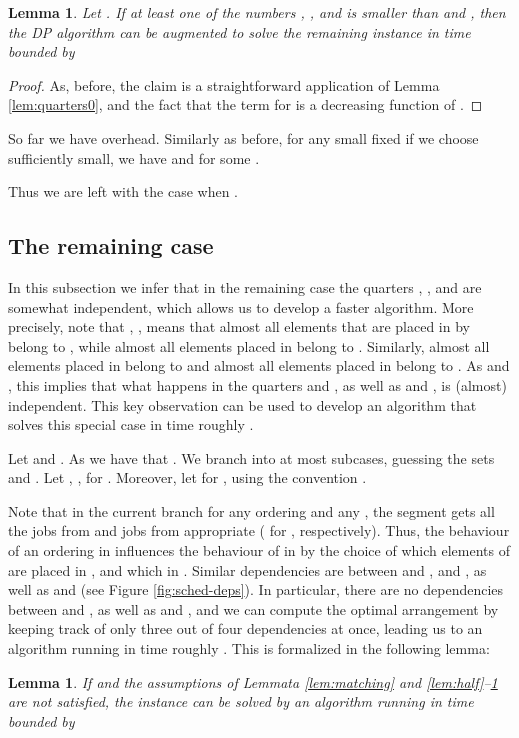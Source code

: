 \documentclass{article}
\newtheorem{lemma}[theorem]{Lemma}
\theoremstyle{definition}
\begin{document}
\begin{lemma}\label{lem:quarters2}
Let .
If at least one of the numbers , ,  and  is smaller than  and ,
then the DP algorithm can be augmented to solve the remaining instance in time bounded by

\end{lemma}
\begin{proof}
As, before, the claim is a straightforward application of Lemma \ref{lem:quarters0}, and the fact that the term  for  is a decreasing function of .
\end{proof}

So far we have  overhead. Similarly as before, for any small fixed  if we choose  sufficiently small, we have 
and  for some . 

Thus we are left with the case when .

\subsection{The remaining case}\label{sec:finish}

In this subsection we infer that in the remaining case the quarters , ,  and  are somewhat independent, which allows us to develop a faster algorithm. More precisely, note that , , means that
almost all elements that are placed in  by  belong to , while almost all elements placed in  belong to . Similarly, almost all elements placed in  belong to  and almost all elements placed in  belong to .
As  and , this implies that what happens in the quarters  and , as well as  and , is (almost) independent. This key observation can be used to develop an algorithm that solves this special case in time roughly .

Let  and .
As  we have that .
We branch into at most  subcases, guessing the sets  and .
Let , ,  for .
Moreover, let  for , using the convention .

Note that in the current branch for any ordering and any , the segment  gets all the jobs from  and 
jobs from appropriate 
( for , respectively).
Thus, the behaviour of an ordering  in  influences the behaviour of  in  by the choice of which elements of  are placed
in , and which in . Similar dependencies are between  and ,  and , as well as  and  (see Figure \ref{fig:sched-deps}).
In particular, there are no dependencies between  and , as well as  and ,
and we can compute the optimal arrangement by keeping track of only three out of four dependencies at once, leading us to an algorithm
running in time roughly .
This is formalized in the following lemma:
\begin{lemma}\label{lem:finish-him}
If  and the assumptions of Lemmata
\ref{lem:matching} and \ref{lem:half}--\ref{lem:quarters2} are not satisfied,
the instance can be solved by an algorithm running in time bounded by

\end{lemma}
\end{document}
